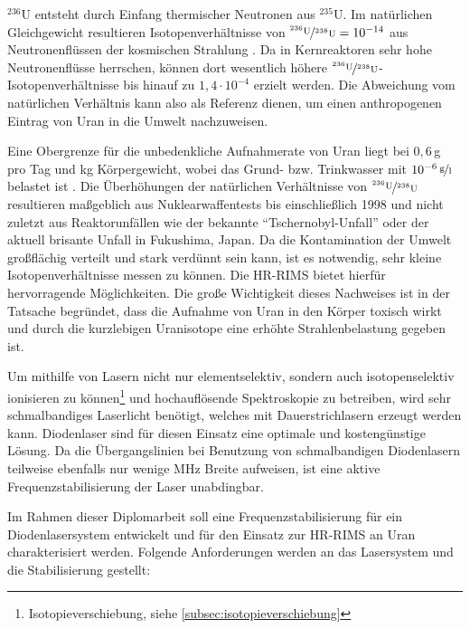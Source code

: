 $^{236}$U entsteht durch Einfang thermischer Neutronen aus $^{235}$U. Im
natürlichen Gleichgewicht resultieren Isotopenverhältnisse von
$\nicefrac{^{236}\text{U}}{^{238}\text{U}}=10^{-14}$ aus Neutronenflüssen der
kosmischen Strahlung \cite{Richter1999}. Da in Kernreaktoren sehr hohe
Neutronenflüsse herrschen, können dort wesentlich höhere
$\nicefrac{^{236}\text{U}}{^{238}\text{U}}$-Isotopenverhältnisse bis hinauf zu
$1,4\cdot10^{-4}$ erzielt werden. Die Abweichung vom natürlichen Verhältnis kann
also als Referenz dienen, um einen anthropogenen Eintrag von Uran in die Umwelt nachzuweisen.\par
Eine Obergrenze für die unbedenkliche Aufnahmerate von Uran liegt
bei $0,6\,$\textmu g pro Tag und kg Körpergewicht, wobei das Grund- bzw.
Trinkwasser mit $10^{-6}\,\nicefrac{\text{g}}{\text{l}}$ belastet ist
\cite{who:2005}. Die Überhöhungen der natürlichen Verhältnisse von 
$\nicefrac{^{236}\text{U}}{^{238}\text{U}}$ resultieren maßgeblich aus
Nuklearwaffentests bis einschließlich 1998 und nicht zuletzt aus Reaktorunfällen
wie der bekannte "`Tschernobyl-Unfall"' oder der aktuell brisante Unfall in
Fukushima, Japan. Da die Kontamination der Umwelt großflächig verteilt und stark
verdünnt sein kann, ist es notwendig, sehr kleine Isotopenverhältnisse messen zu
können. Die HR-RIMS bietet hierfür hervorragende Möglichkeiten. Die große
Wichtigkeit dieses Nachweises ist in der Tatsache begründet, dass die Aufnahme von Uran in den Körper toxisch
wirkt und durch die kurzlebigen Uranisotope eine erhöhte Strahlenbelastung
gegeben ist.\par
Um mithilfe von Lasern nicht nur elementselektiv, sondern auch
isotopenselektiv ionisieren zu können\footnote{Isotopieverschiebung, siehe
\ref{subsec:isotopieverschiebung}} und hochauflösende Spektroskopie zu
betreiben, wird sehr schmalbandiges Laserlicht benötigt, welches mit
Dauerstrichlasern erzeugt werden kann. Diodenlaser sind für diesen Einsatz eine
optimale und kostengünstige Lösung. Da die Übergangslinien bei Benutzung von
schmalbandigen Diodenlasern teilweise ebenfalls nur wenige MHz Breite aufweisen,
ist eine aktive Frequenzstabilisierung der Laser unabdingbar.\par
Im Rahmen dieser Diplomarbeit soll eine Frequenzstabilisierung für ein
Diodenlasersystem entwickelt und für den Einsatz zur HR-RIMS an Uran charakterisiert werden.
Folgende Anforderungen werden an das Lasersystem und die Stabilisierung gestellt:
